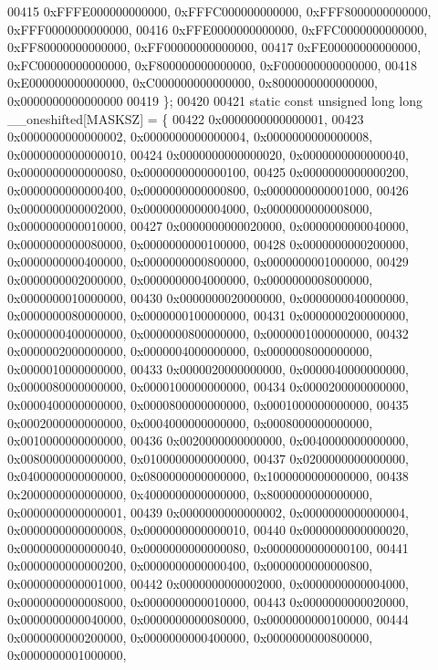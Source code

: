 \begin{DoxyCode}
00415         0xFFFE000000000000, 0xFFFC000000000000, 0xFFF8000000000000, 0xFFF0000000000000,
00416         0xFFE0000000000000, 0xFFC0000000000000, 0xFF80000000000000, 0xFF00000000000000,
00417         0xFE00000000000000, 0xFC00000000000000, 0xF800000000000000, 0xF000000000000000,
00418         0xE000000000000000, 0xC000000000000000, 0x8000000000000000, 0x0000000000000000
00419 \};
00420 
00421 \textcolor{keyword}{static} \textcolor{keyword}{const} \textcolor{keywordtype}{unsigned} \textcolor{keywordtype}{long} \textcolor{keywordtype}{long} \_\_oneshifted[MASKSZ] = \{
00422         0x0000000000000001,
00423         0x0000000000000002, 0x0000000000000004, 0x0000000000000008, 0x0000000000000010,
00424         0x0000000000000020, 0x0000000000000040, 0x0000000000000080, 0x0000000000000100,
00425         0x0000000000000200, 0x0000000000000400, 0x0000000000000800, 0x0000000000001000,
00426         0x0000000000002000, 0x0000000000004000, 0x0000000000008000, 0x0000000000010000,
00427         0x0000000000020000, 0x0000000000040000, 0x0000000000080000, 0x0000000000100000,
00428         0x0000000000200000, 0x0000000000400000, 0x0000000000800000, 0x0000000001000000,
00429         0x0000000002000000, 0x0000000004000000, 0x0000000008000000, 0x0000000010000000,
00430         0x0000000020000000, 0x0000000040000000, 0x0000000080000000, 0x0000000100000000,
00431         0x0000000200000000, 0x0000000400000000, 0x0000000800000000, 0x0000001000000000,
00432         0x0000002000000000, 0x0000004000000000, 0x0000008000000000, 0x0000010000000000,
00433         0x0000020000000000, 0x0000040000000000, 0x0000080000000000, 0x0000100000000000,
00434         0x0000200000000000, 0x0000400000000000, 0x0000800000000000, 0x0001000000000000,
00435         0x0002000000000000, 0x0004000000000000, 0x0008000000000000, 0x0010000000000000,
00436         0x0020000000000000, 0x0040000000000000, 0x0080000000000000, 0x0100000000000000,
00437         0x0200000000000000, 0x0400000000000000, 0x0800000000000000, 0x1000000000000000,
00438         0x2000000000000000, 0x4000000000000000, 0x8000000000000000, 0x0000000000000001,
00439         0x0000000000000002, 0x0000000000000004, 0x0000000000000008, 0x0000000000000010,
00440         0x0000000000000020, 0x0000000000000040, 0x0000000000000080, 0x0000000000000100,
00441         0x0000000000000200, 0x0000000000000400, 0x0000000000000800, 0x0000000000001000,
00442         0x0000000000002000, 0x0000000000004000, 0x0000000000008000, 0x0000000000010000,
00443         0x0000000000020000, 0x0000000000040000, 0x0000000000080000, 0x0000000000100000,
00444         0x0000000000200000, 0x0000000000400000, 0x0000000000800000, 0x0000000001000000,

\end{DoxyCode}
